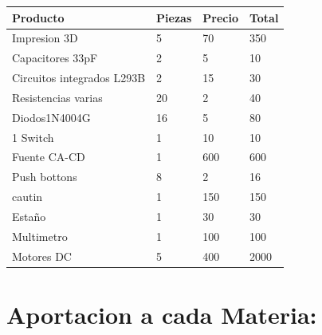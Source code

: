 \documentclass[14pt,a4paper]{article}
\begin{document}
\begin{tabular}{|l|l|l|l|}
\hline
	Producto & Piezas & Precio & Total\\
\hline
	Impresion 3D & 5 & 70 & 350\\

\hline
	Capacitores 33pF & 2 & 5 & 10\\
\hline
	 Circuitos integrados L293B & 2 & 15 & 30\\
\hline
	Resistencias varias & 20 & 2 & 40\\
\hline
	Diodos1N4004G & 16 & 5 & 80\\
\hline
	1 Switch & 1 & 10 & 10\\

\hline
	Fuente CA-CD & 1 & 600 & 600\\
\hline
	Push bottons & 8 & 2 & 16\\
\hline
cautin & 1 & 150 & 150\\
\hline
	Estaño & 1 & 30 & 30\\
\hline
	Multimetro & 1 & 100 & 100\\
\hline
Motores DC & 5 & 400 & 2000\\
\hline
\end{tabular}

\section{Aportacion a cada Materia:}
\end{document}
